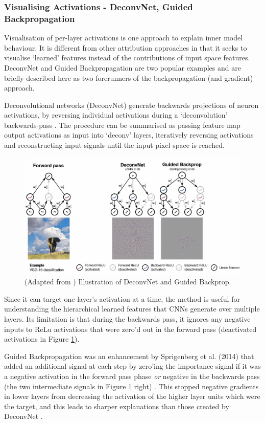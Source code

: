 \documentclass[main]{subfiles}
\begin{document}
\subsubsection{Visualising Activations - DeconvNet, Guided Backpropagation}
Visualisation of per-layer activations is one approach to explain inner model behaviour. It is different from other attribution approaches in that it seeks to visualise `learned' features instead of the contributions of input space features. DeconvNet and Guided Backpropagation are two popular examples and are briefly described here as two forerunners of the backpropagation (and gradient) approach.

Deconvolutional networks (DeconvNet) generate backwards projections of neuron activations, by reversing individual activations during a `deconvolution' backwards-pass \cite{zeilerfergus2013}. The procedure can be summarised as passing feature map output activations as input into `deconv' layers, iteratively reversing activations and reconstructing input signals until the input pixel space is reached.

\begin{figure}[h]
\centering
\includegraphics[scale=0.3]{deconv.png}
\caption{(Adapted from \cite{patternnet}) Illustration of DeconvNet and Guided Backprop.}
\label{deconvimg}
\end{figure}

Since it can target one layer's activation at a time, the method is useful for understanding the hierarchical learned features that CNNs generate over multiple layers. Its limitation is that during the backwards pass, it ignores any negative inputs to ReLu activations that were zero'd out in the forward pass (deactivated activations in Figure \ref{deconvimg}).

Guided Backpropagation was an enhancement by Sprigenberg et al. (2014) that added an additional signal at each step by zero'ing the importance signal if it was a negative activation in the forward pass phase \textit{or} negative in the backwards pass (the two intermediate signals in Figure \ref{deconvimg} right) \cite{springenberg}. This stopped negative gradients in lower layers from decreasing the activation of the higher layer units which were the target, and this leads to sharper explanations than those created by DeconvNet \cite{springenberg}. 
\end{document}
